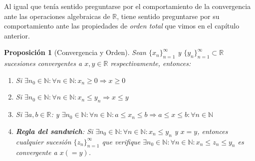 \documentclass[10pt,a4paper,openright]{book}
\theoremstyle{break}
\newtheorem{prop}{Proposición}[chapter]
\begin{document}
Al igual que tenía sentido preguntarse por el comportamiento de la convergencia ante las operaciones algebraicas de $\mathbb{R}$, tiene sentido preguntarse por su comportamiento ante las propiedades de \textit{orden total} que vimos en el capítulo anterior.

\begin{prop}[Convergencia y Orden]
Sean $\{x_n\}_{n=1}^\infty$ y $\{y_n\}_{n=1}^\infty\subset \mathbb R$ sucesiones convergentes a $x,y\in \mathbb R$ respectivamente, entonces:
\begin{enumerate}
\item Si $\exists n_0 \in \mathbb{N}: \forall n\in \mathbb{N}: x_n\geq 0 \Rightarrow x\geq 0$
\item Si $\exists n_0 \in \mathbb{N}: \forall n\in \mathbb{N}: x_n\leq y_n \Rightarrow x\leq y$
\item Si $\exists a,b\in \mathbb R$: y $\exists n_0 \in \mathbb{N}: \forall n\in \mathbb{N}: a\leq x_n\leq b\Rightarrow a\leq x\leq b: \forall n \in \mathbb N$
\item \textbf{Regla del sandwich}: Si $\exists n_0 \in \mathbb{N}: \forall n\in \mathbb{N} : x_n\leq y_n$ y $x=y$, entonces cualquier sucesión $\{z_n\}_{n=1}^\infty $ que verifique $\exists n_0 \in \mathbb{N}: \forall n\in \mathbb{N} : x_n\leq z_n\leq y_n$ es convergente a $x(=y)$.
\end{enumerate}
\end{prop}
\end{document}
